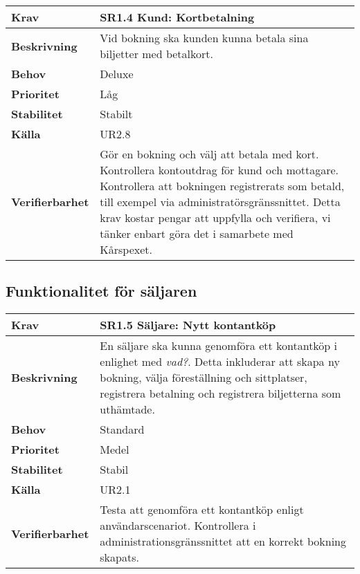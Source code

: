 \documentclass[a4paper, twoside, 11pt, titlepage]{article}
\begin{document}
	\begin{tabular} { p{2.6cm} p{12.5cm} }
		\hline
		\sffamily\textbf{Krav} & \sffamily\textbf{SR1.4 Kund: Kortbetalning } \\
		\hline
		\sffamily\textbf{Beskrivning} & Vid bokning ska kunden kunna betala sina biljetter med betalkort.  \\
		\hline
		\sffamily\textbf{Behov} & Deluxe  \\
		\hline
		\sffamily\textbf{Prioritet} & Låg  \\
		\hline
		\sffamily\textbf{Stabilitet} & Stabilt  \\
		\hline
		\sffamily\textbf{Källa} & UR2.8  \\
		\hline
		\sffamily\textbf{Verifierbarhet} & Gör en bokning och välj att betala med kort. Kontrollera kontoutdrag för kund och mottagare. Kontrollera att bokningen registrerats som betald, till exempel via administratörsgränssnittet. Detta krav kostar pengar att uppfylla och verifiera, vi tänker enbart göra det i samarbete med Kårspexet.  \\
		\hline
	\end{tabular}


	\subsection{Funktionalitet för säljaren}


	\begin{tabular} { p{2.6cm} p{12.5cm} }
		\hline
		\sffamily\textbf{Krav} & \sffamily\textbf{SR1.5 Säljare: Nytt kontantköp } \\
		\hline
		\sffamily\textbf{Beskrivning} & En säljare ska kunna genomföra ett kontantköp i enlighet med \emph{vad?}. Detta inkluderar att skapa ny bokning, välja föreställning och sittplatser, registrera betalning och registrera biljetterna som uthämtade.  \\
		\hline
		\sffamily\textbf{Behov} & Standard  \\
		\hline
		\sffamily\textbf{Prioritet} & Medel  \\
		\hline
		\sffamily\textbf{Stabilitet} & Stabil  \\
		\hline
		\sffamily\textbf{Källa} & UR2.1  \\
		\hline
		\sffamily\textbf{Verifierbarhet} & Testa att genomföra ett kontantköp enligt användarscenariot. Kontrollera i administrationsgränssnittet att en korrekt bokning skapats.  \\
		\hline
	\end{tabular}
	\vspace{6mm}
\end{document}
